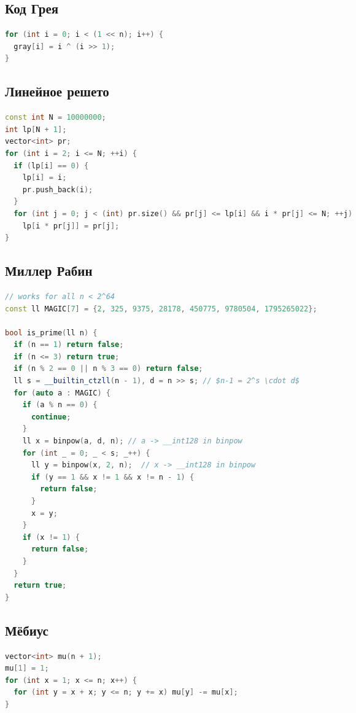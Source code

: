 \documentclass[9pt,a4paper,landscape,twosided]{extarticle}
\begin{document}
\begin{multicols*}{3}
\subsection{Код Грея}
\begin{lstlisting}[language=C++]
for (int i = 0; i < (1 << n); i++) {
  gray[i] = i ^ (i >> 1);
}
\end{lstlisting}

\subsection{Линейное решето}
\begin{lstlisting}[language=C++]
const int N = 10000000;
int lp[N + 1];
vector<int> pr;
for (int i = 2; i <= N; ++i) {
  if (lp[i] == 0) {
    lp[i] = i;
    pr.push_back(i);
  }
  for (int j = 0; j < (int) pr.size() && pr[j] <= lp[i] && i * pr[j] <= N; ++j)
    lp[i * pr[j]] = pr[j];
}
\end{lstlisting}

\subsection{Миллер Рабин}
\begin{lstlisting}[language=C++]
// works for all n < 2^64
const ll MAGIC[7] = {2, 325, 9375, 28178, 450775, 9780504, 1795265022};

bool is_prime(ll n) {
  if (n == 1) return false;
  if (n <= 3) return true;
  if (n % 2 == 0 || n % 3 == 0) return false;
  ll s = __builtin_ctzll(n - 1), d = n >> s; // $n-1 = 2^s \cdot d$
  for (auto a : MAGIC) {
    if (a % n == 0) {
      continue;
    }
    ll x = binpow(a, d, n); // a -> __int128 in binpow
    for (int _ = 0; _ < s; _++) {
      ll y = binpow(x, 2, n);  // x -> __int128 in binpow
      if (y == 1 && x != 1 && x != n - 1) {
        return false;
      }
      x = y;
    }
    if (x != 1) {
      return false;
    }
  }
  return true;
}
\end{lstlisting}

\subsection{Мёбиус}
\begin{lstlisting}[language=C++]
vector<int> mu(n + 1);
mu[1] = 1;
for (int x = 1; x <= n; x++) {
  for (int y = x + x; y <= n; y += x) mu[y] -= mu[x];
}
\end{lstlisting}


\end{multicols*}
\end{document}
